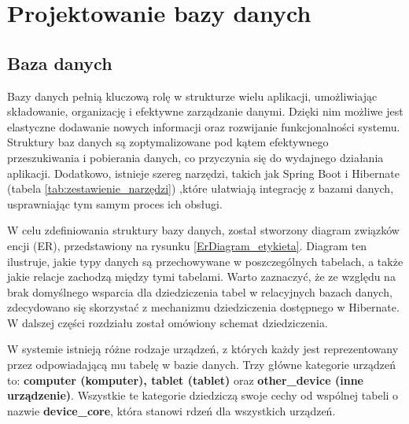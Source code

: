 \chapter{Projektowanie bazy danych}
\section{Baza danych}

Bazy danych pełnią kluczową rolę w strukturze wielu aplikacji, umożliwiając składowanie, organizację i efektywne zarządzanie danymi. Dzięki nim możliwe jest elastyczne dodawanie nowych informacji oraz rozwijanie funkcjonalności systemu. Struktury baz danych są zoptymalizowane pod kątem efektywnego przeszukiwania i pobierania danych, co przyczynia się do wydajnego działania aplikacji. Dodatkowo, istnieje szereg narzędzi, takich jak Spring Boot i Hibernate (tabela \ref{tab:zestawienie_narzędzi})
,które ułatwiają integrację z bazami danych, usprawniając tym samym proces ich obsługi.

W celu zdefiniowania struktury bazy danych, został stworzony diagram związków encji (ER), przedstawiony na rysunku \ref{ErDiagram_etykieta}. Diagram ten ilustruje, jakie typy danych są przechowywane w poszczególnych tabelach, a także jakie relacje zachodzą między tymi tabelami. Warto zaznaczyć, że ze względu na brak domyślnego wsparcia dla dziedziczenia tabel w relacyjnych bazach danych, zdecydowano się skorzystać z mechanizmu dziedziczenia dostępnego w Hibernate. W dalszej części rozdziału został omówiony schemat dziedziczenia.

W systemie istnieją różne rodzaje urządzeń, z których każdy jest reprezentowany przez odpowiadającą mu tabelę w bazie danych. Trzy główne kategorie urządzeń to: \textbf{computer (komputer), tablet (tablet)} oraz \textbf{other\_device (inne urządzenie)}. Wszystkie te kategorie dziedziczą swoje cechy od wspólnej tabeli o nazwie \textbf{device\_core}, która stanowi rdzeń dla wszystkich urządzeń.

